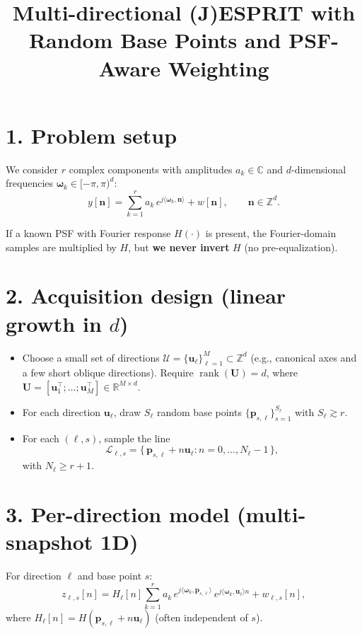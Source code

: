 \documentclass[11pt,a4paper]{article}
\title{\textbf{Multi-directional (J)ESPRIT with Random Base Points and PSF-Aware Weighting}}
\author{}
\date{}
\begin{document}
\maketitle

\section*{1. Problem setup}

We consider $r$ complex components with amplitudes $a_k \in \mathbb{C}$ and $d$-dimensional frequencies $\boldsymbol{\omega}_k \in [-\pi,\pi)^d$:
\begin{equation}
y[\mathbf{n}] = \sum_{k=1}^{r} a_k\, e^{j\langle \boldsymbol{\omega}_k, \mathbf{n}\rangle} + w[\mathbf{n}], 
\qquad \mathbf{n}\in\mathbb{Z}^d.
\end{equation}

If a known PSF with Fourier response $H(\cdot)$ is present, the Fourier-domain samples are multiplied by $H$, but \textbf{we never invert} $H$ (no pre-equalization).

\section*{2. Acquisition design (linear growth in $d$)}

\begin{itemize}
  \item Choose a small set of directions 
  $\mathcal{U} = \{\mathbf{u}_\ell\}_{\ell=1}^{M} \subset \mathbb{Z}^d$
  (e.g., canonical axes and a few short oblique directions).  
  Require $\operatorname{rank}(\mathbf{U}) = d$, where 
  $\mathbf{U} = [\mathbf{u}_1^\top; \dots; \mathbf{u}_M^\top] \in \mathbb{R}^{M\times d}$.
  \item For each direction $\mathbf{u}_\ell$, draw $S_\ell$ random base points 
  $\{\mathbf{p}_{s,\ell}\}_{s=1}^{S_\ell}$ with $S_\ell \gtrsim r$.
  \item For each $(\ell,s)$, sample the line
  \[
  \mathcal{L}_{\ell,s} = \{\,\mathbf{p}_{s,\ell} + n\mathbf{u}_\ell : n = 0,\dots,N_\ell-1\,\},
  \]
  with $N_\ell \ge r + 1$.
\end{itemize}

\section*{3. Per-direction model (multi-snapshot 1D)}

For direction $\ell$ and base point $s$:
\begin{equation}
z_{\ell,s}[n]
= H_\ell[n] \sum_{k=1}^{r} a_k\, e^{j\langle \boldsymbol{\omega}_k,\mathbf{p}_{s,\ell}\rangle}\, 
e^{j\langle \boldsymbol{\omega}_k,\mathbf{u}_\ell\rangle n} + w_{\ell,s}[n],
\end{equation}
where $H_\ell[n] = H(\mathbf{p}_{s,\ell}+n\mathbf{u}_\ell)$ (often independent of $s$).
\end{document}
